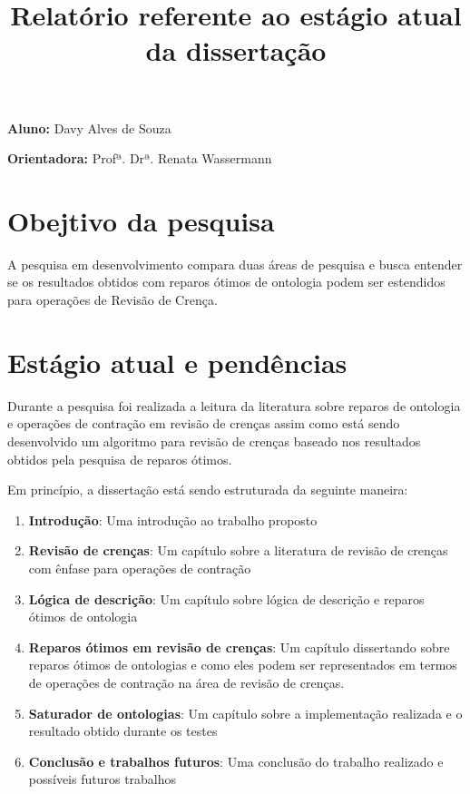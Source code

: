 \documentclass[a4paper,12pt,twoside,english,brazilian]{article}
\title{Relatório referente ao estágio atual da dissertação}
\date{}
\begin{document}
\maketitle

\textbf{Aluno:} Davy Alves de Souza

\textbf{Orientadora:} Profª. Drª. Renata Wassermann

\thispagestyle{empty} %



\section{Obejtivo da pesquisa}

A pesquisa em desenvolvimento compara duas áreas de pesquisa e busca entender se os resultados obtidos com reparos ótimos de ontologia podem ser estendidos para operações de Revisão de Crença.

\section{Estágio atual e pendências}

Durante a pesquisa foi realizada a leitura da literatura sobre reparos de ontologia e operações de contração em revisão de crenças assim como está sendo desenvolvido um algoritmo para revisão de crenças baseado nos resultados obtidos pela pesquisa de reparos ótimos.

Em princípio, a dissertação está sendo estruturada da seguinte maneira:

\begin{enumerate}
  \item \textbf{Introdução}: Uma introdução ao trabalho proposto
  \item \textbf{Revisão de crenças}: Um capítulo sobre a literatura de revisão de crenças com ênfase para operações de contração
  \item \textbf{Lógica de descrição}: Um capítulo sobre lógica de descrição e reparos ótimos de ontologia
  \item \textbf{Reparos ótimos em revisão de crenças}: Um capítulo dissertando sobre reparos ótimos de ontologias e como eles podem ser representados em termos de operações de contração na área de revisão de crenças.
  \item \textbf{Saturador de ontologias}: Um capítulo sobre a implementação realizada e o resultado obtido durante os testes
  \item \textbf{Conclusão e trabalhos futuros}: Uma conclusão do trabalho realizado e possíveis futuros trabalhos  
\end{enumerate}
\end{document}
